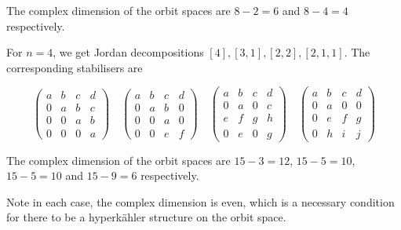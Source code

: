 \documentclass{article}
\begin{document}
The complex dimension of the orbit spaces are \(8 - 2 = 6\) and \(8 - 4 = 4\) respectively.

For \(n=4\), we get Jordan decompositions \([4], [3, 1], [2, 2], [2, 1, 1]\). The corresponding stabilisers are

\[\begin{pmatrix}
    a & b & c & d \\
    0 & a & b & c \\
    0 & 0 & a & b \\
    0 & 0 & 0 & a
\end{pmatrix} \quad \begin{pmatrix}
    a & b & c & d \\
    0 & a & b & 0 \\
    0 & 0 & a & 0 \\
    0 & 0 & e & f
\end{pmatrix} \quad \begin{pmatrix}
    a & b & c & d \\
    0 & a & 0 & c \\
    e & f & g & h \\
    0 & e & 0 & g
\end{pmatrix} \quad \begin{pmatrix}
    a & b & c & d \\
    0 & a & 0 & 0 \\
    0 & e & f & g \\
    0 & h & i & j
\end{pmatrix}\]

The complex dimension of the orbit spaces are \(15 - 3 = 12\), \(15 - 5 = 10\), \(15 - 5 = 10\) and \(15 - 9 = 6\) respectively.

Note in each case, the complex dimension is even, which is a necessary condition for there to be a hyperk\"ahler structure on the orbit space.
\end{document}
